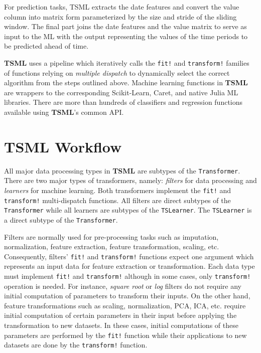 \documentclass{juliacon}
\begin{document}
\vskip 6pt

For prediction tasks, TSML extracts the date features and 
convert the value column into matrix form parameterized by 
the size and stride of the sliding window. The final part joins
 the date features and the value matrix to serve as input to the 
 ML with the output representing the values of the time periods 
 to be predicted ahead of time.
 
 \vskip 6pt
 
\textbf{TSML} uses a pipeline which iteratively calls the \texttt{fit!} and \texttt{transform!}
families of functions relying on \emph{multiple dispatch} to dynamically select the correct algorithm from the steps outlined above. Machine learning functions in 
\textbf{TSML} are wrappers to the corresponding Scikit-Learn, Caret, and native Julia ML libraries. 
There are more than hundreds of classifiers and regression functions available using \textbf{TSML}'s common API.

\section{TSML Workflow}
\label{sec:tsmlworkflow}
%

All major data processing types in \textbf{TSML} are subtypes of the \texttt{Transformer}. There are two major types of transformers, namely: \emph{filters} for data processing and \emph{learners} for machine learning. Both transformers implement the \texttt{fit!} and \texttt{transform!} multi-dispatch functions. All filters are direct subtypes of the \texttt{Transformer} while all learners are subtypes of the \texttt{TSLearner}. The \texttt{TSLearner} is a direct subtype of the \texttt{Transformer}.


\vskip 6pt

Filters are normally used for pre-processing tasks such as imputation, normalization, feature extraction, feature transformation, scaling, etc.
Consequently, filters' \texttt{fit!} and \texttt{transform!} functions expect one argument which represents an input data for feature extraction or transformation. Each data type must implement \texttt{fit!} and \texttt{transform!} although in some cases, only \texttt{transform!} operation is needed. For instance, \emph{square root} or \emph{log} filters do not require any initial computation of parameters to transform their inputs. On the other hand, feature transformations such as scaling, normalization, PCA, ICA, etc. require initial computation of certain parameters in their input before applying the transformation to new datasets. In these cases, initial computations of these parameters are performed by the \texttt{fit!} function while their applications to new datasets are done by the \texttt{transform!} function. 
\end{document}

